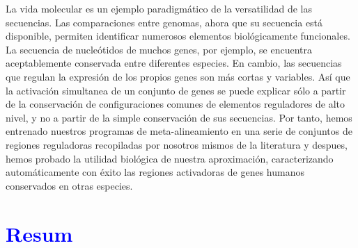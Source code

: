 \begin{small}
La vida molecular es un ejemplo paradigmático de la versatilidad de las secuencias. 
Las comparaciones entre genomas, ahora que su secuencia está disponible,
permiten identificar numerosos elementos biológicamente funcionales. La secuencia 
de nucleótidos de muchos genes, por ejemplo, se encuentra aceptablemente conservada 
entre diferentes especies. En cambio, las secuencias que regulan la expresión de los 
propios genes son más cortas y variables. Así que la activación simultanea de un 
conjunto de genes se puede explicar sólo a partir de la conservación de configuraciones 
comunes de elementos reguladores de alto nivel, y no a partir de la simple conservación
de sus secuencias. Por tanto, hemos entrenado nuestros programas de 
meta-alineamiento en una serie de conjuntos de regiones reguladoras recopiladas
por nosotros mismos de la literatura y despues, hemos probado la utilidad
biológica de nuestra aproximación, caracterizando automáticamente con éxito
las regiones activadoras de genes humanos conservados en otras especies.
\end{small}

\clearemptydoublepage

\chapter*{\textcolor{blue}{\textbf{R}esum}}

